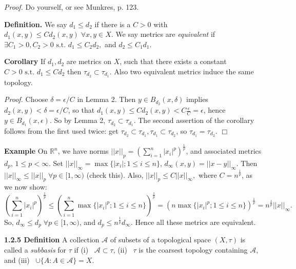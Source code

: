 \documentclass[12pt]{article}
\newcommand{\st}[0]{ \textrm{ s.t. } }
\newcommand{\reals}[0] { \mathbb{R}}
\newcommand{\eps}[0] {  \epsilon }
\newcommand{\A}[0] { \mathcal{A} }
\begin{document}
\begin{flushleft} \emph{Proof.  } Do yourself, or see Munkres, p. 123.
\end{flushleft}

\begin{flushleft} {\bf Definition.} We say $d_1 \le d_2$ if
there is a $C > 0$ with  $d_1(x,y) \le C d_2(x,y) \; \forall x,y \in X$.
 We say metrics are {\em equivalent} if $\exists C_1 >0, C_2>0 \st d_1 \le C_2 d_2, $ and
$d_2 \le C_1 d_1$.
\end{flushleft}

\begin{flushleft} {\bf Corollary} If $d_1, d_2$ are metrics on $X$, such that there exists a constant $C>0 \st d_1 \le C d_2$ then $\tau_{d_2} \subset \tau_{d_1}$.
Also two equivalent metrics induce the same topology.
\end{flushleft}

\begin{flushleft} \emph{Proof.  } Choose $\delta = \eps / C$ in Lemma 2.
Then  $y \in B_{d_2}(x, \delta)$ implies $d_2(x,y) < \delta = \eps / C$,
so that $d_1(x,y) \le C d_2(x,y) <  C \frac{\eps}{C}
 = \eps$, hence  $y \in B_{d_1}(x, \eps)$.
 So by Lemma 2, $\tau_{d_2} \subset \tau_{d_1}$. The second assertion of the corollary follows from the first used twice: get $\tau_{d_2} \subset \tau_{d_1}, \tau_{d_1} \subset
 \tau_{d_2}$, so $\tau_{d_1} = \tau_{d_2}$. $\Box$
\end{flushleft}


\begin{flushleft} {\bf Example } On $\reals^n$, we have norms $||x||_p = \left( \sum_{i=1}^n |x_i|^p \right) ^{\frac{1}{p}}$, and associated metrics $d_p$, $1 \le p < \infty$.
Set  $||x||_\infty = \max  \{ |x_i|; 1 \le i \le n \}$, $d_\infty(x,y) = ||x-y||_\infty$.
Then $||x||_\infty \le || x || _p \; \forall p \in [1, \infty)$ (check this).  Also,
 $||x||_p \le C ||x||_\infty,$ where $C = n^\frac{1}{p}$, as we now show:
$$ \left( \sum_{i=1}^n |x_i|^p \right) ^{\frac{1}{p}} \le  \left( \sum_{i=1}^n  \max
 \{ |x_i|^p; 1 \le i \le n \} \right)^{\frac{1}{p}} =   \left( n  \max  \{ |x_i|^p; 1 \le i \le n \} \right) ^{\frac{1}{p}} = n^\frac{1}{p} ||x||_\infty. $$
So, $d_\infty \le d_p \; \forall p \in [1,\infty)$, and $d_p \le n^\frac{1}{p} d_\infty$.
Hence all these metrics are equivalent.
\end{flushleft}

\begin{flushleft} {\bf 1.2.5 Definition } A collection $\A$ of subsets of a topological space $(X, \tau)$ is called a \emph{subbasis} for $\tau$ if (i) \ $\A \subset \tau$,
(ii) \  $\tau$ is the coarsest topology containing $\A$, and
(iii) \ $\cup \{ A : A \in \A \} = X$.
\end{flushleft}
\end{document}
